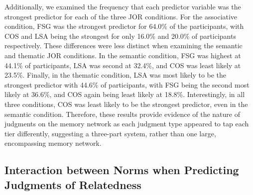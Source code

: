 \documentclass[english,,man]{apa6}
\begin{document}
Additionally, we examined the frequency that each predictor variable was
the strongest predictor for each of the three JOR conditions. For the
associative condition, FSG was the strongest predictor for 64.0\% of the
participants, with COS and LSA being the strongest for only 16.0\% and
20.0\% of participants respectively. These differences were less
distinct when examining the semantic and thematic JOR conditions. In the
semantic condition, FSG was highest at 44.1\% of participants, LSA was
second at 32.4\%, and COS was least likely at 23.5\%. Finally, in the
thematic condition, LSA was most likely to be the strongest predictor
with 44.6\% of participants, with FSG being the second most likely at
36.6\%, and COS again being least likely at 18.8\%. Interestingly, in
all three conditions, COS was least likely to be the strongest
predictor, even in the semantic condition. Therefore, these results
provide evidence of the nature of judgments on the memory network as
each judgment type appeared to tap each tier differently, suggesting a
three-part system, rather than one large, encompassing memory network.

\subsection{Interaction between Norms when Predicting Judgments of
Relatedness}\label{interaction-between-norms-when-predicting-judgments-of-relatedness}
\end{document}
